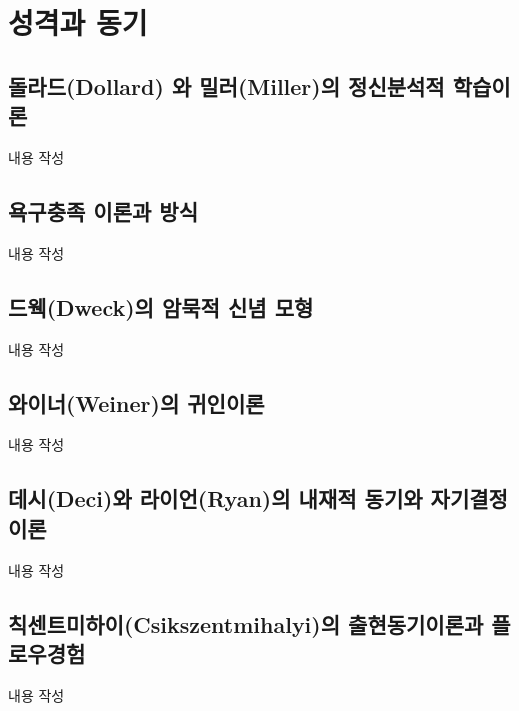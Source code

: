 \section{성격과 동기}

\subsection{돌라드(Dollard) 와 밀러(Miller)의 정신분석적 학습이론}
내용 작성

\subsection{욕구충족 이론과 방식}
내용 작성

\subsection{드웩(Dweck)의 암묵적 신념 모형}
내용 작성

\subsection{와이너(Weiner)의 귀인이론}
내용 작성

\subsection{데시(Deci)와 라이언(Ryan)의 내재적 동기와 자기결정이론}
내용 작성

\subsection{칙센트미하이(Csikszentmihalyi)의 출현동기이론과 플로우경험}
내용 작성
